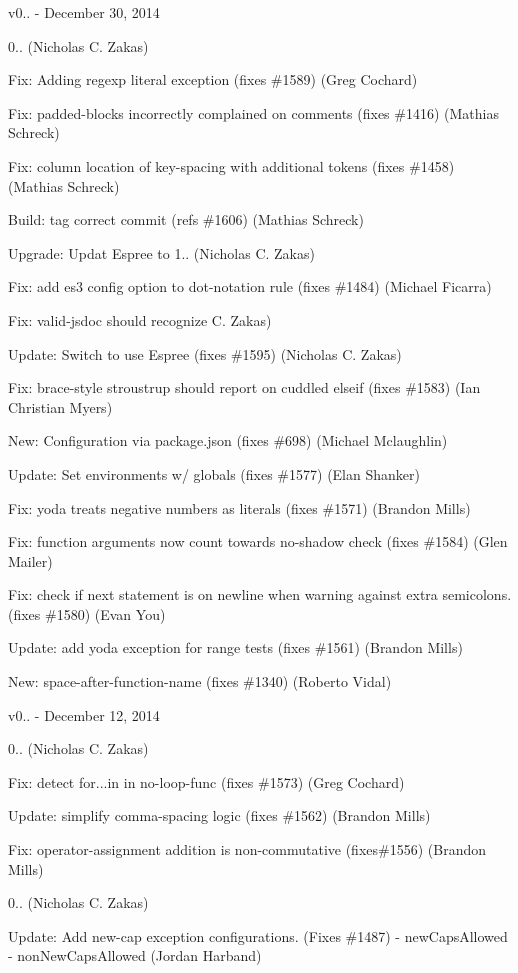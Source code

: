 v0.. -\/ December 30, 2014


\begin{DoxyItemize}
\item 0.. (Nicholas C. Zakas)
\item Fix\+: Adding regexp literal exception (fixes \#1589) (Greg Cochard)
\item Fix\+: padded-\/blocks incorrectly complained on comments (fixes \#1416) (Mathias Schreck)
\item Fix\+: column location of key-\/spacing with additional tokens (fixes \#1458) (Mathias Schreck)
\item Build\+: tag correct commit (refs \#1606) (Mathias Schreck)
\item Upgrade\+: Updat Espree to 1.. (Nicholas C. Zakas)
\item Fix\+: add es3 config option to dot-\/notation rule (fixes \#1484) (Michael Ficarra)
\item Fix\+: valid-\/jsdoc should recognize C. Zakas)
\item Update\+: Switch to use Espree (fixes \#1595) (Nicholas C. Zakas)
\item Fix\+: brace-\/style stroustrup should report on cuddled elseif (fixes \#1583) (Ian Christian Myers)
\item New\+: Configuration via package.\+json (fixes \#698) (Michael Mclaughlin)
\item Update\+: Set environments w/ globals (fixes \#1577) (Elan Shanker)
\item Fix\+: yoda treats negative numbers as literals (fixes \#1571) (Brandon Mills)
\item Fix\+: function arguments now count towards no-\/shadow check (fixes \#1584) (Glen Mailer)
\item Fix\+: check if next statement is on newline when warning against extra semicolons. (fixes \#1580) (Evan You)
\item Update\+: add yoda exception for range tests (fixes \#1561) (Brandon Mills)
\item New\+: space-\/after-\/function-\/name (fixes \#1340) (Roberto Vidal)
\end{DoxyItemize}

v0.. -\/ December 12, 2014


\begin{DoxyItemize}
\item 0.. (Nicholas C. Zakas)
\item Fix\+: detect for...in in no-\/loop-\/func (fixes \#1573) (Greg Cochard)
\item Update\+: simplify comma-\/spacing logic (fixes \#1562) (Brandon Mills)
\item Fix\+: operator-\/assignment addition is non-\/commutative (fixes\#1556) (Brandon Mills)
\item 0.. (Nicholas C. Zakas)
\item Update\+: Add new-\/cap exception configurations. (Fixes \#1487) -\/ {\ttfamily new\+Caps\+Allowed} -\/ {\ttfamily non\+New\+Caps\+Allowed} (Jordan Harband)
\end{DoxyItemize}


